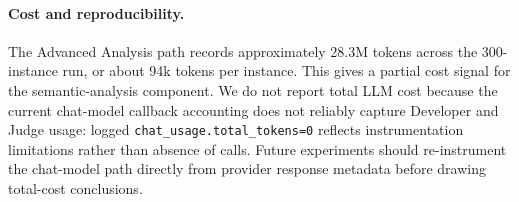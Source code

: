 \documentclass[11pt]{article}
\begin{document}
\paragraph{Cost and reproducibility.}
The Advanced Analysis path records approximately 28.3M tokens across the 300-instance run, or about 94k tokens per instance.  This gives a partial cost signal for the semantic-analysis component.  We do not report total LLM cost because the current chat-model callback accounting does not reliably capture Developer and Judge usage: logged \texttt{chat\_usage.total\_tokens=0} reflects instrumentation limitations rather than absence of calls.  Future experiments should re-instrument the chat-model path directly from provider response metadata before drawing total-cost conclusions.
\end{document}
